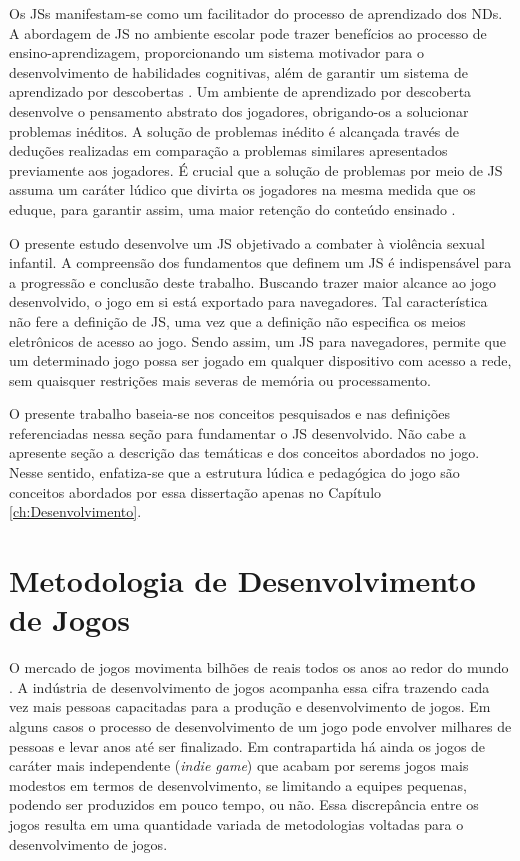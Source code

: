 Os \acp{JS} manifestam-se como um facilitador do processo de aprendizado dos \acp{ND}. A abordagem de \ac{JS} no ambiente escolar pode trazer benefícios ao processo de ensino-aprendizagem, proporcionando um sistema motivador para o desenvolvimento de habilidades cognitivas, além de garantir um sistema de aprendizado por descobertas \cite{carvalho2017move4math}. Um ambiente de aprendizado por descoberta desenvolve o pensamento abstrato dos jogadores, obrigando-os a solucionar problemas inéditos. A solução de problemas inédito é alcançada través de deduções realizadas em comparação a problemas similares apresentados previamente aos jogadores. É crucial que a solução de problemas por meio de \ac{JS} assuma um caráter lúdico que divirta os jogadores na mesma medida que os eduque, para garantir assim, uma maior retenção do conteúdo ensinado \cite{tarouco2004jogos}. 

O presente estudo desenvolve um \ac{JS} objetivado a combater à violência sexual infantil. A compreensão dos fundamentos que definem um \ac{JS} é indispensável para a progressão e conclusão deste trabalho. Buscando trazer maior alcance ao jogo desenvolvido, o jogo em si está exportado para navegadores. Tal característica não fere a definição de \ac{JS}, uma vez que a definição não especifica os meios eletrônicos de acesso ao jogo. Sendo assim, um \ac{JS} para navegadores, permite que um determinado jogo possa ser jogado em qualquer dispositivo com acesso a rede, sem quaisquer restrições mais severas de memória ou processamento. 

O presente trabalho baseia-se nos conceitos pesquisados e nas definições referenciadas nessa seção para fundamentar o \ac{JS} desenvolvido. Não cabe a apresente seção a descrição das temáticas e dos conceitos abordados no jogo. Nesse sentido, enfatiza-se que a estrutura lúdica e pedagógica do jogo são conceitos abordados por essa dissertação apenas no Capítulo \ref{ch:Desenvolvimento}.


\section{Metodologia de Desenvolvimento de Jogos}\label{sec:Engenharia}

O mercado de jogos movimenta bilhões de reais todos os anos ao redor do mundo \cite{fortim2020games}. A indústria de desenvolvimento de jogos acompanha essa cifra trazendo cada vez mais pessoas capacitadas para a produção e desenvolvimento de jogos. Em alguns casos o processo de desenvolvimento de um jogo pode envolver milhares de pessoas e levar anos até ser finalizado. Em contrapartida há ainda os jogos de caráter mais independente (\textit{indie game}) que acabam por serems jogos mais modestos em termos de desenvolvimento, se limitando a equipes pequenas, podendo ser produzidos em pouco tempo, ou não. Essa discrepância entre os jogos resulta em uma quantidade variada de metodologias voltadas para o desenvolvimento de jogos.

